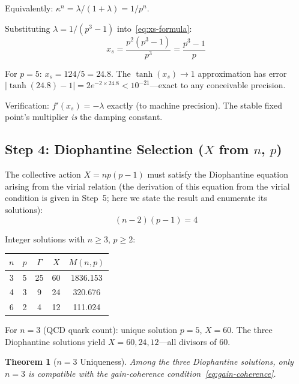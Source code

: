 \documentclass[12pt,a4paper]{article}
\newtheorem{theorem}{Theorem}
\theoremstyle{definition}
\begin{document}
Equivalently: $\kappa^n = \lambda/(1+\lambda) = 1/p^n$.

Substituting $\lambda = 1/(p^3 - 1)$ into~\eqref{eq:xs-formula}:
\begin{equation}\label{eq:xs-exact}
  x_s = \frac{p^2(p^3-1)}{p^3} = \frac{p^3-1}{p}
\end{equation}

For $p = 5$: $x_s = 124/5 = 24.8$. The $\tanh(x_s) \to 1$ approximation
has error $|\tanh(24.8) - 1| = 2e^{-2\times24.8} < 10^{-21}$---exact to
any conceivable precision.

Verification: $f'(x_s) = -\lambda$ exactly (to machine precision).
The stable fixed point's multiplier \emph{is} the damping constant.

\subsection*{Step 4: Diophantine Selection ($X$ from $n$, $p$)}

The collective action $X = n p(p-1)$ must satisfy the Diophantine
equation arising from the virial relation (the derivation of this
equation from the virial condition is given in Step~5; here we state
the result and enumerate its solutions):
\begin{equation}\label{eq:diophantine}
  (n - 2)(p - 1) = 4
\end{equation}

Integer solutions with $n \ge 3$, $p \ge 2$:

\begin{center}
\begin{tabular}{ccccc}
\toprule
$n$ & $p$ & $\Gamma$ & $X$ & $M(n,p)$ \\
\midrule
3 & 5 & 25 & 60 & 1836.153 \\
4 & 3 &  9 & 24 &  320.676 \\
6 & 2 &  4 & 12 &  111.024 \\
\bottomrule
\end{tabular}
\end{center}

For $n = 3$ (QCD quark count): unique solution $p = 5$, $X = 60$.
The three Diophantine solutions yield $X = 60, 24, 12$---all divisors
of 60.

\begin{theorem}[$n = 3$ Uniqueness]
Among the three Diophantine solutions, only $n = 3$ is compatible with
the gain-coherence condition~\eqref{eq:gain-coherence}.
\end{theorem}
\end{document}
